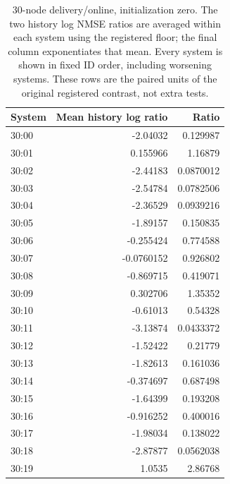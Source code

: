\begin{table}[ht]
\centering\scriptsize
\begin{tabular}{lrr}
\toprule
System & Mean history log ratio & Ratio\\
\midrule
30:00 & -2.04032 & 0.129987\\
30:01 & 0.155966 & 1.16879\\
30:02 & -2.44183 & 0.0870012\\
30:03 & -2.54784 & 0.0782506\\
30:04 & -2.36529 & 0.0939216\\
30:05 & -1.89157 & 0.150835\\
30:06 & -0.255424 & 0.774588\\
30:07 & -0.0760152 & 0.926802\\
30:08 & -0.869715 & 0.419071\\
30:09 & 0.302706 & 1.35352\\
30:10 & -0.61013 & 0.54328\\
30:11 & -3.13874 & 0.0433372\\
30:12 & -1.52422 & 0.21779\\
30:13 & -1.82613 & 0.161036\\
30:14 & -0.374697 & 0.687498\\
30:15 & -1.64399 & 0.193208\\
30:16 & -0.916252 & 0.400016\\
30:17 & -1.98034 & 0.138022\\
30:18 & -2.87877 & 0.0562038\\
30:19 & 1.0535 & 2.86768\\
\bottomrule
\end{tabular}
\caption{30-node delivery/online, initialization zero. The two history log NMSE ratios are averaged within each system using the registered floor; the final column exponentiates that mean. Every system is shown in fixed ID order, including worsening systems. These rows are the paired units of the original registered contrast, not extra tests.}
\end{table}
